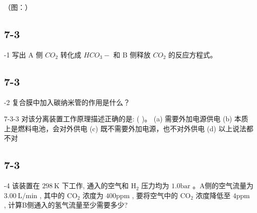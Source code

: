 （图：）

\subsection*{7-3}
-1 写出 A 侧 $CO_{2}$ 转化成 $HCO_{3}-$ 和 B 侧释放 $CO_{2}$ 的反应方程式。

\subsection*{7-3}
-2 复合膜中加入碳纳米管的作用是什么？

7-3-3 对该分离装置工作原理描述正确的是: ( )。
(a) 需要外加电源供电
(b) 本质上是燃料电池，会对外供电
(c) 既不需要外加电源，也不对外供电
(d) 以上说法都不对

\subsection*{7-3}
-4 该装置在 $298 \mathrm{~K}$ 下工作, 通入的空气和 $\mathrm{H}_{2}$ 压力均为 $1.0 \mathrm{bar}$ 。A侧的空气流量为 $3.00 \mathrm{~L} / \mathrm{min}$ , 其中的 $\mathrm{CO}_{2}$ 浓度为 $400 \mathrm{ppm}$ , 要将空气中的 $\mathrm{CO}_{2}$ 浓度降低至 $4 \mathrm{ppm}$ , 计算B侧通入的氢气流量至少需要多少?
